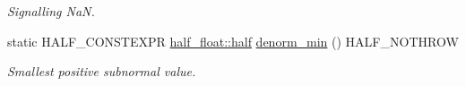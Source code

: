 \begin{DoxyCompactItemize}
\begin{DoxyCompactList}\small\item\em Signalling NaN. \end{DoxyCompactList}\item 
static H\+A\+L\+F\+\_\+\+C\+O\+N\+S\+T\+E\+X\+PR \hyperlink{classhalf__float_1_1half}{half\+\_\+float\+::half} \hyperlink{classstd_1_1numeric__limits_3_01half__float_1_1half_01_4_ae6c0f9e198bc76d3edd0565e11c63664}{denorm\+\_\+min} () H\+A\+L\+F\+\_\+\+N\+O\+T\+H\+R\+OW\hypertarget{classstd_1_1numeric__limits_3_01half__float_1_1half_01_4_ae6c0f9e198bc76d3edd0565e11c63664}{}\label{classstd_1_1numeric__limits_3_01half__float_1_1half_01_4_ae6c0f9e198bc76d3edd0565e11c63664}

\begin{DoxyCompactList}\small\item\em Smallest positive subnormal value. \end{DoxyCompactList}\end{DoxyCompactItemize}
